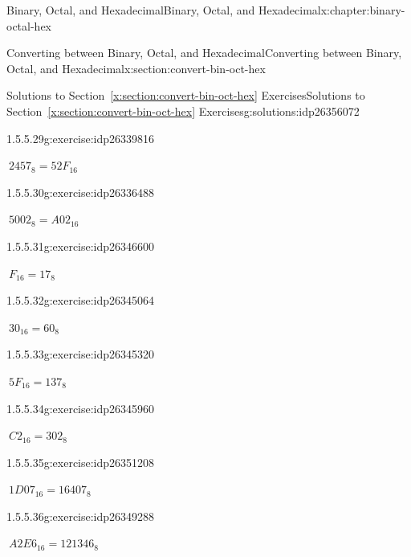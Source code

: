 \documentclass[twoside,10pt,]{book}
\newcommand{\xreffont}{\relax}
\numberwithin{equation}{section}
\begin{document}
\begin{chapterptx}{Binary, Octal, and Hexadecimal}{}{Binary, Octal, and Hexadecimal}{}{}{x:chapter:binary-octal-hex}
\begin{sectionptx}{Converting between Binary, Octal, and Hexadecimal}{}{Converting between Binary, Octal, and Hexadecimal}{}{}{x:section:convert-bin-oct-hex}
\begin{solutions-subsection}{Solutions to Section~{\xreffont\ref*{x:section:convert-bin-oct-hex}} Exercises}{}{Solutions to Section~{\xreffont\ref*{x:section:convert-bin-oct-hex}} Exercises}{}{}{g:solutions:idp26356072}
\begin{exercisegroup}
\begin{divisionsolutioneg}{1.5.5.29}{}{g:exercise:idp26339816}
\par\smallskip%
\noindent\hypertarget{g:solution:idp26336104-main}{}\(\ 2457_8=52F_{16}\)\end{divisionsolutioneg}%
\begin{divisionsolutioneg}{1.5.5.30}{}{g:exercise:idp26336488}%
\par\smallskip%
\noindent\hypertarget{g:solution:idp26346216-main}{}\(\ 5002_8=A02_{16}\)\end{divisionsolutioneg}%
\end{exercisegroup}
\par\medskip\noindent
\begin{exercisegroup}
\begin{divisionsolutioneg}{1.5.5.31}{}{g:exercise:idp26346600}%
\par\smallskip%
\noindent\hypertarget{g:solution:idp26351080-main}{}\(\ F_{16}=17_8\)\end{divisionsolutioneg}%
\begin{divisionsolutioneg}{1.5.5.32}{}{g:exercise:idp26345064}%
\par\smallskip%
\noindent\hypertarget{g:solution:idp26345192-main}{}\(\ 30_{16}=60_8\)\end{divisionsolutioneg}%
\begin{divisionsolutioneg}{1.5.5.33}{}{g:exercise:idp26345320}%
\par\smallskip%
\noindent\hypertarget{g:solution:idp26344680-main}{}\(\ 5F_{16}=137_8\)\end{divisionsolutioneg}%
\begin{divisionsolutioneg}{1.5.5.34}{}{g:exercise:idp26345960}%
\par\smallskip%
\noindent\hypertarget{g:solution:idp26346088-main}{}\(\ C2_{16}=302_8\)\end{divisionsolutioneg}%
\begin{divisionsolutioneg}{1.5.5.35}{}{g:exercise:idp26351208}%
\par\smallskip%
\noindent\hypertarget{g:solution:idp26347624-main}{}\(\ 1D07_{16}=16407_8\)\end{divisionsolutioneg}%
\begin{divisionsolutioneg}{1.5.5.36}{}{g:exercise:idp26349288}%
\par\smallskip%
\noindent\hypertarget{g:solution:idp26351720-main}{}\(\ A2E6_{16}=121346_8\)\end{divisionsolutioneg}%
\end{exercisegroup}
\par\medskip\noindent
\begin{exercisegroup}

\end{exercisegroup}
\end{solutions-subsection}
\end{sectionptx}
\end{chapterptx}
\end{document}
